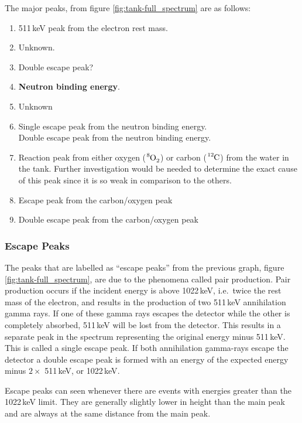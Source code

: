 The major peaks, from figure \ref{fig:tank-full_spectrum} are as follows:
	\begin{enumerate}\itemsep1pt \parskip0pt 
		\item 511\,keV peak from the electron rest mass.
		\item Unknown.
		\item Double escape peak?
		\item \textbf{Neutron binding energy}.
		\item Unknown
		\item Single escape peak from the neutron binding energy.\\
		Double escape peak from the neutron binding energy.
		\item Reaction peak from either oxygen ($\ce{^8O_2}$) or carbon ($\ce{^{12}C}$) from the water in the tank. Further investigation would be needed to determine the exact cause of this peak since it is so weak in comparison to the others.
		\item Escape peak from the carbon/oxygen peak
		\item Double escape peak from the carbon/oxygen peak
	\end{enumerate}

\subsubsection{Escape Peaks} %
\label{ssub:escape_peaks}
The peaks that are labelled as ``escape peaks'' from the previous graph, figure \ref{fig:tank-full_spectrum}, are due to the phenomena called pair production. Pair production occurs if the incident energy is above 1022\,keV, i.e.\ twice the rest mass of the electron, and results in the production of two 511\,keV annihilation gamma rays. If one of these gamma rays escapes the detector while the other is completely absorbed, 511\,keV will be lost from the detector. This results in a separate peak in the spectrum representing the original energy minus 511\,keV. This is called a single escape peak. If both annihilation gamma-rays escape the detector a double escape peak is formed with an energy of the expected energy minus $2\times$ 511\,keV, or 1022\,keV\cite{baratta}.

Escape peaks can seen whenever there are events with energies greater than the 1022\,keV limit. They are generally slightly lower in height than the main peak and are always at the same distance from the main peak.

